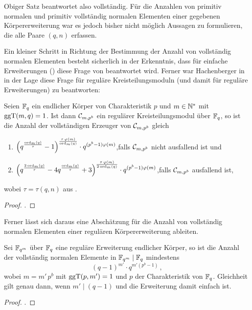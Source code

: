 Obiger Satz beantwortet also  vollständig. Für die Anzahlen von 
primitiv normalen und primitiv vollständig normalen Elementen einer gegebenen
Körpererweiterung war es jedoch bisher nicht möglich Aussagen zu formulieren,
die alle Paare $(q,n)$ erfassen.

Ein kleiner Schritt in Richtung der Bestimmung der 
Anzahl von vollständig normalen Elementen 
besteht sicherlich in der Erkenntnis, dass für einfache Erweiterungen
() diese Frage von  beantwortet
wird. Ferner war Hachenberger in \autocite[Section 21]{hachenberger1997finite}
in der Lage diese Frage für reguläre Kreisteilungsmoduln (und damit für
reguläre Erweiterungen) zu beantworten:

\begin{satz}
  \label{satz:anzahl_vollst_erzeuger}
  Seien $\mathbb{F}_q$ ein endlicher Körper von Charakteristik $p$ und $m \in \mathbb{N}^\ast$
  mit $\operatorname{ggT}(m,q)=1$. Ist dann $\mathcal{C}_{m,p^b}$ ein regulärer Kreisteilungsmodul
  über $\mathbb{F}_q$, so ist die Anzahl der vollständigen Erzeuger von 
  $\mathcal{C}_{m,p^b}$ gleich
  \begin{enumerate}
    \item $\displaystyle \left( q^{\frac{\ord_m(q)}{\tau}}-1 \right)%
      ^{\frac{\tau\,\varphi(m)}{\ord_m(q)}} \cdot 
      q^{(p^b-1)\varphi(m)}$,\quad falls $\mathcal{C}_{m,p^b}$ nicht ausfallend ist und
    \item $\displaystyle \left( q^{\frac{2\ord_m(q)}{\tau}}
      -4q^{\frac{\ord_m(q)}{\tau}}+3\right)%
      ^{\frac{\tau\,\varphi(m)}{2\ord_m(q)}} \cdot 
      q^{(p^b-1)\varphi(m)}$,\quad falls $\mathcal{C}_{m,p^b}$ ausfallend ist,
  \end{enumerate}
  wobei $\tau = \tau(q,n)$ aus .
\end{satz}
\begin{proof}
  \autocite[Proposition 21.1, Proposition 21.2]{hachenberger1997finite}.
\end{proof}

Ferner lässt sich daraus eine Abschätzung für die Anzahl von vollständig
normalen Elementen einer regulären Körpererweiterung ableiten.

\begin{satz}
  Sei $\mathbb{F}_{q^m}$ über $\mathbb{F}_q$ eine reguläre Erweiterung endlicher Körper, so ist
  die Anzahl der vollständig normalen Elemente in $\mathbb{F}_{q^m}\mid \mathbb{F}_q$
  mindestens
  \[ (q-1)^{m'}\cdot q^{m'(p^b-1)} \,,\]
  wobei $m = m'\,p^b$ mit $\operatorname{ggT}(p,m')=1$ und $p$ der Charakteristik von $\mathbb{F}_q$.
  Gleichheit gilt genau dann, wenn $m' \mid (q-1)$ und die Erweiterung damit 
  einfach ist.
\end{satz}
\begin{proof}
  \autocite[Theorem 21.3, Theorem 6.1]{hachenberger1997finite}.
\end{proof}


